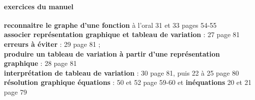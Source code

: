 \documentclass[main.tex]{subfiles}
\begin{document}
\paragraph{exercices du  manuel} 
\textbf{reconnaitre le graphe d'une fonction} à l'oral 31 et 33 pages 54-55\\ 
\textbf{associer représentation graphique et tableau de variation} : 27 page 81 \\
\textbf{erreurs à éviter}  : 29 page 81 ;\\ 
\textbf{produire un tableau de variation à partir d'une représentation graphique} : 28  page 81 \\
\textbf{interprétation de tableau de variation} : 30 page 81, puis 22 à 25 page 80 \\	
\textbf{résolution graphique équations} : 50 et 52 page 59-60  et   \textbf{inéquations}  20 et 21 page 79
\end{document}
